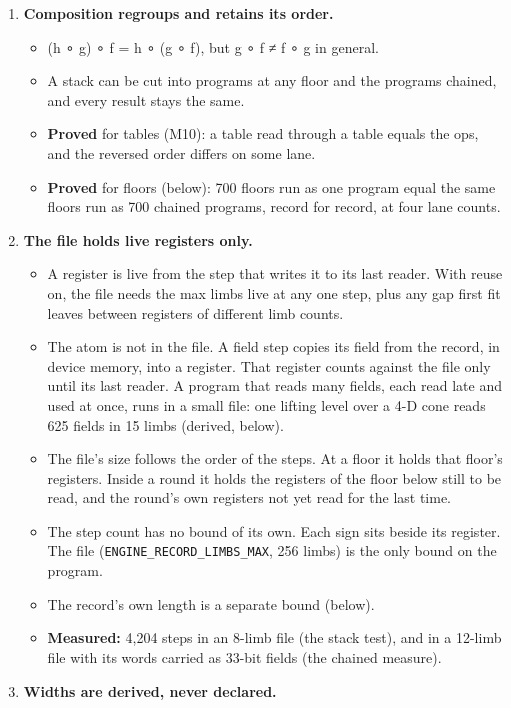 \begin{enumerate}
\item \textbf{Composition regroups and retains its order.}

\begin{itemize}
\item (h ∘ g) ∘ f = h ∘ (g ∘ f), but g ∘ f ≠ f ∘ g in general.
\item A stack can be cut into programs at any floor and the programs chained, and every result stays the same.
\item \textbf{Proved} for tables (M10): a table read through a table equals the ops, and the reversed order differs on some lane.
\item \textbf{Proved} for floors (below): 700 floors run as one program equal the same floors run as 700 chained programs, record for record, at four lane counts.
\end{itemize}
\item \textbf{The file holds live registers only.}

\begin{itemize}
\item A register is live from the step that writes it to its last reader. With reuse on, the file needs the max limbs live at any one step, plus any gap first fit leaves between registers of different limb counts.
\item The atom is not in the file. A field step copies its field from the record, in device memory, into a register. That register counts against the file only until its last reader. A program that reads many fields, each read late and used at once, runs in a small file: one lifting level over a 4-D cone reads 625 fields in 15 limbs (derived, below).
\item The file's size follows the order of the steps. At a floor it holds that floor's registers. Inside a round it holds the registers of the floor below still to be read, and the round's own registers not yet read for the last time.
\item The step count has no bound of its own. Each sign sits beside its register. The file (\texttt{ENGINE\_\allowbreak{}RECORD\_\allowbreak{}LIMBS\_\allowbreak{}MAX}, 256 limbs) is the only bound on the program.
\item The record's own length is a separate bound (below).
\item \textbf{Measured:} 4,204 steps in an 8-limb file (the stack test), and in a 12-limb file with its words carried as 33-bit fields (the chained measure).
\end{itemize}
\item \textbf{Widths are derived, never declared.}


\end{enumerate}
